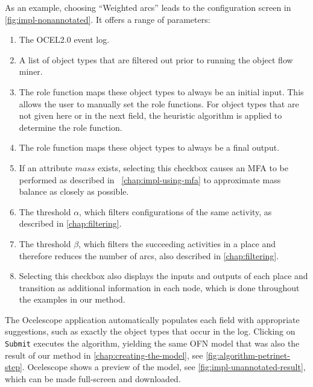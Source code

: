 As an example, choosing \enquote{Weighted arcs} leads to the configuration screen in \autoref{fig:impl-nonannotated}.
It offers a range of parameters:
\begin{enumerate}[label={\circled{\arabic*}}]
    \item The OCEL2.0 event log.
    
    \item 
    A list of object types that are filtered out prior to running the object flow miner.

    \item 
    The role function maps these object types to always be an initial input.
    This allows the user to manually set the role functions.
    For object types that are not given here or in the next field, the heuristic algorithm is applied to determine the role function.

    \item 
    The role function maps these object types to always be a final output.

    \item 
    If an attribute $mass$ exists, selecting this checkbox causes an MFA to be performed as described in ~\cref{chap:impl-using-mfa} to approximate mass balance as closely as possible.

    \item 
    The threshold $\alpha$, which filters configurations of the same activity, as described in \cref{chap:filtering}.

    \item 
    The threshold $\beta$, which filters the succeeding activities in a place and therefore reduces the number of arcs, also described in \cref{chap:filtering}.

    \item 
    Selecting this checkbox also displays the inputs and outputs of each place and transition as additional information in each node, which is done throughout the examples in our method.
\end{enumerate}
The Ocelescope application automatically populates each field with appropriate suggestions, such as exactly the object types that occur in the log.
Clicking on \texttt{Submit} executes the algorithm, yielding the same OFN model that was also the result of our method in \cref{chap:creating-the-model}, see \autoref{fig:algorithm-petrinet-step}.
Ocelescope shows a preview of the model, see \autoref{fig:impl-unannotated-result}, which can be made full-screen and downloaded.



